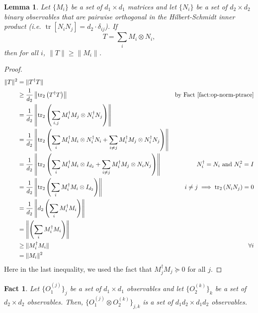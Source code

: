 \documentclass[11pt]{article}
\theoremstyle{plain}
\newtheorem{lemma}[theorem]{Lemma}
\newtheorem{fact}[theorem]{Fact}
\DeclareMathOperator{\tr}{tr}
\begin{document}
\begin{lemma} \label{lem:opnorm-orthog-components}
    Let $\{M_i\}$ be a set of $d_1 \times d_1$ matrices and let $\{N_i\}$ be a set of $d_2 \times d_2$ binary observables that are pairwise orthogonal in the Hilbert-Schmidt inner product (i.e. $\tr[N_i N_j] = d_2 \cdot \delta_{ij}$). If
    \begin{equation}
        T = \sum\limits_{i} M_i \otimes N_i,
    \end{equation}
    then for all $i$, $ \|T\| \geq \|M_i\|$.
\end{lemma}
\begin{proof}
    \begin{align*}
        \|T\|^2 &= \|T^\dagger T\|\\
        &\geq \frac{1}{d_2} \left\|\text{tr}_2\left(T^\dagger T\right)\right\| &\text{by Fact~\ref{fact:op-norm-ptrace}}\\
        &= \frac{1}{d_2} \left\|\text{tr}_2\left(\sum\limits_{i,j} M_i^\dagger M_j \otimes N_i^\dagger N_j\right)\right\|\\
        &= \frac{1}{d_2} \left\|\text{tr}_2\left(\sum\limits_{i} M_i^\dagger M_i \otimes N_i^\dagger N_i + \sum\limits_{i \neq j} M_i^\dagger M_j \otimes N_i^\dagger N_j\right)\right\|\\
        &= \frac{1}{d_2} \left\|\text{tr}_2\left(\sum\limits_{i} M_i^\dagger M_i \otimes I_{d_2} + \sum\limits_{i \neq j} M_i^\dagger M_j \otimes N_i N_j\right)\right\| & N_i^\dagger = N_i \text{ and } N_i^2 = I\\
        &= \frac{1}{d_2} \left\|\text{tr}_2\left(\sum\limits_{i} M_i^\dagger M_i \otimes I_{d_2}\right)\right\| & i \neq j \implies \text{tr}_2 \left(N_i N_j\right) = 0 \\
        &= \frac{1}{d_2} \left\|d_2 \left(\sum\limits_{i} M_i^\dagger M_i\right)\right\| \\
        &= \left\| \left(\sum\limits_{i} M_i^\dagger M_i\right)\right\|\\
        &\geq \|M_i^\dagger M_i\| &\forall i\\
        &= \|M_i\|^2
    \end{align*}
    Here in the last inequality, we used the fact that $M_j ^\dagger M_j \succeq 0$ for all $j$.
\end{proof}
\begin{fact}\label{fact:tensor-product-observables}
    Let $\{O_1^{(j)}\}_j$ be a set of $d_1 \times d_1$ observables and let $\{O_2^{(k)}\}_k$ be a set of $d_2 \times d_2$ observables. Then, $\{O_1^{(j)} \otimes O_2^{(k)}\}_{j,k}$ is a set of $d_1 d_2 \times d_1 d_2$ observables.
\end{fact}
\end{document}

